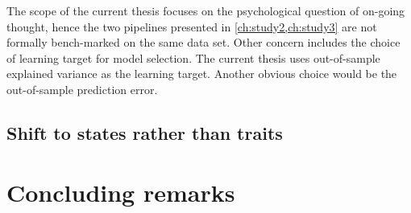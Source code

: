 The scope of the current thesis focuses on the psychological question of on-going thought, hence the two pipelines presented in \cref{ch:study2,ch:study3} are not formally bench-marked on the same data set. Other concern includes the choice of learning target for model selection. The current thesis uses out-of-sample explained variance as the learning target. Another obvious choice would be the out-of-sample prediction error. 
 
\subsection{Shift to states rather than traits}

%
%
%


\section{Concluding remarks}
\label{ch:discussion:summary}
